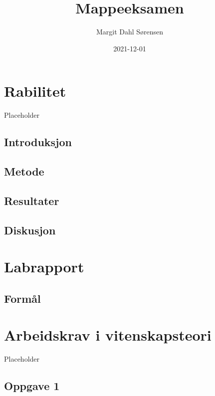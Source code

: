 \documentclass[
]{book}
\title{Mappeeksamen}
\author{Margit Dahl Sørensen}
\date{2021-12-01}
\begin{document}
\maketitle

{
\setcounter{tocdepth}{1}
\tableofcontents
}
\hypertarget{rabilitet}{%
\chapter{Rabilitet}\label{rabilitet}}

Placeholder

\hypertarget{introduksjon}{%
\section{Introduksjon}\label{introduksjon}}

\hypertarget{metode}{%
\section{Metode}\label{metode}}

\hypertarget{resultater}{%
\section{Resultater}\label{resultater}}

\hypertarget{diskusjon}{%
\section{Diskusjon}\label{diskusjon}}

\hypertarget{labrapport}{%
\chapter{Labrapport}\label{labrapport}}

\hypertarget{formuxe5l}{%
\section{Formål}\label{formuxe5l}}

\hypertarget{arbeidskrav-i-vitenskapsteori}{%
\chapter{Arbeidskrav i vitenskapsteori}\label{arbeidskrav-i-vitenskapsteori}}

Placeholder

\hypertarget{oppgave-1}{%
\section{Oppgave 1}\label{oppgave-1}}
\end{document}
